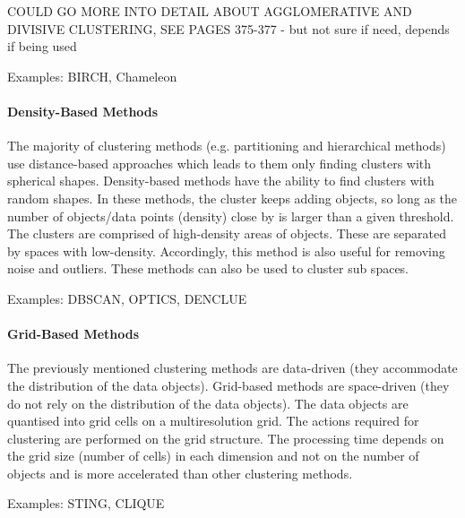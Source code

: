   COULD GO MORE INTO DETAIL ABOUT AGGLOMERATIVE AND DIVISIVE CLUSTERING, SEE PAGES 375-377 - but not sure if need, depends if being used

  Examples: BIRCH, Chameleon

  

  \paragraph{Density-Based Methods}
  The majority of clustering methods (e.g. partitioning and hierarchical methods) use distance-based approaches which leads to them only finding clusters with spherical shapes. Density-based methods have the ability to find clusters with random shapes. In these methods, the cluster keeps adding objects, so long as the number of objects/data points (density) close by is larger than a given threshold. The clusters are comprised of high-density areas of objects. These are separated by spaces with low-density. Accordingly, this method is also useful for removing noise and outliers.
  These methods can also be used to cluster sub spaces.

  Examples: DBSCAN, OPTICS, DENCLUE



  \paragraph{Grid-Based Methods}
  The previously mentioned clustering methods are data-driven (they accommodate the distribution of the data objects). Grid-based methods are space-driven (they do not rely on the distribution of the data objects). The data objects are quantised into grid cells on a multiresolution grid. The actions required for clustering are performed on the grid structure. The processing time depends on the grid size (number of cells) in each dimension and not on the number of objects and is more accelerated than other clustering methods.
  
  Examples: STING, CLIQUE
